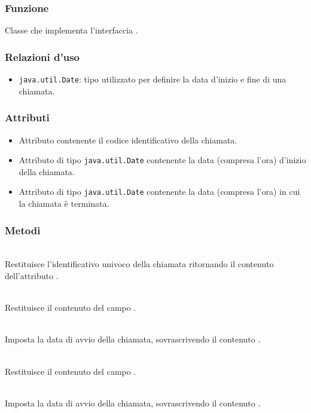 
\subsubsection*{Funzione}
Classe che implementa l'interfaccia .

\subsubsection*{Relazioni d'uso}
\begin{itemize}
	\item \texttt{java.util.Date}: tipo utilizzato per definire la data d'inizio e fine di una chiamata.
\end{itemize}

\subsubsection*{Attributi}

\begin{itemize}
	\item{}
	Attributo contenente il codice identificativo della chiamata.
	\item{}
	Attributo di tipo \texttt{java.util.Date} contenente la data (compresa l'ora) d'inizio della chiamata.
	\item{}
	Attributo di tipo \texttt{java.util.Date} contenente la data (compresa l'ora) in cui la chiamata è terminata.
\end{itemize}

\subsubsection*{Metodi}
\begin{description}
	\item{}\\
	Restituisce l'identificativo univoco della chiamata ritornando il contenuto dell'attributo .
	\item{}\\
	Restituisce il contenuto del campo .
	\item{}\\
	Imposta la data di avvio della chiamata, sovrascrivendo il contenuto .
	\item{}\\
	Restituisce il contenuto del campo .
	\item{}\\
	Imposta la data di avvio della chiamata, sovrascrivendo il contenuto .
\end{description}

